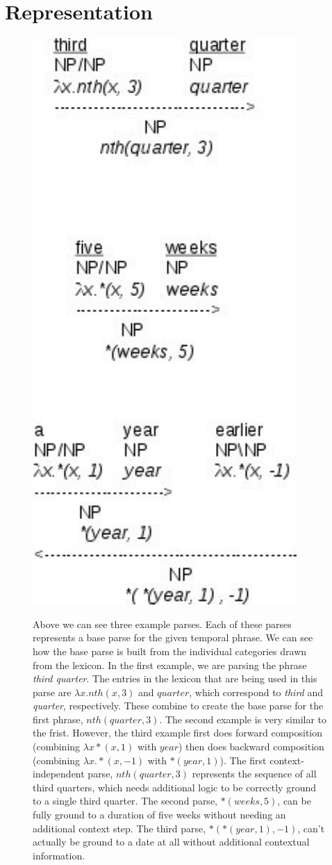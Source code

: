 \section{Representation}
\label{sec:representation}

\begin{figure}[t!]
   \center
   {\includegraphics[width=0.5\columnwidth]{fig/lexiconExample3.pdf}}
   \caption{Above we can see three example parses. Each of these parses represents a base parse for the given temporal phrase. We can see how the base parse is built from the individual categories drawn from the lexicon. In the first example, we are parsing the phrase \emph{third quarter}. The entries in the lexicon that are being used in this parse are $\lambda x.nth(x,3)$ and $quarter$, which correspond to \emph{third} and \emph{quarter}, respectively. These combine to create the base parse for the first phrase, $nth(quarter,3)$. 
The second example is very similar to the frist. However, the third example first does forward composition (combining $\lambda x*(x,1)$ with $year$) then does backward composition (combining $\lambda x.*(x,-1)$ with $*(year,1)$). 
The first context-independent parse, $nth(quarter,3)$ represents the sequence of all third quarters, which needs additional logic to be correctly ground to a single third quarter. The second parse, $*(weeks, 5)$, can be fully ground to a duration of five weeks without needing an additional context step. The third parse, $*(*(year,1),-1)$, can't actually be ground to a date at all without additional contextual information. 
   } 
   \label{fig:lexiconExample}
\end{figure}


